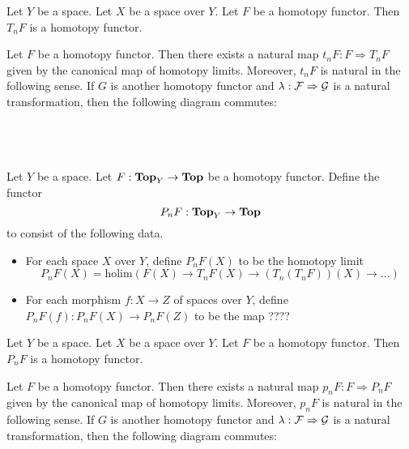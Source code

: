\documentclass[a4paper]{article}
\begin{document}
\begin{lmm}{}{} Let $Y$ be a space. Let $X$ be a space over $Y$. Let $F$ be a homotopy functor. Then $T_nF$ is a homotopy functor.   
\end{lmm}

\begin{prp}{}{} Let $F$ be a homotopy functor. Then there exists a natural map $t_nF:F\Rightarrow T_nF$ given by the canonical map of homotopy limits. Moreover, $t_nF$ is natural in the following sense. If $G$ is another homotopy functor and $\lambda:\mathcal{F}\Rightarrow\mathcal{G}$ is a natural transformation, then the following diagram commutes: \\~\\
\\~\\
\end{prp}

\begin{defn}{}{} Let $Y$ be a space. Let $F:\bold{Top}_Y\to\bold{Top}$ be a homotopy functor. Define the functor $$P_nF:\bold{Top}_Y\to\bold{Top}$$ to consist of the following data. 
\begin{itemize}
\item For each space $X$ over $Y$, define $P_nF(X)$ to be the homotopy limit $$P_nF(X)=\text{holim}(F(X)\to T_nF(X)\to(T_n(T_nF))(X)\to\dots)$$
\item For each morphism $f:X\to Z$ of spaces over $Y$, define $P_nF(f):P_nF(X)\to P_nF(Z)$ to be the map ????
\end{itemize}
\end{defn}

\begin{lmm}{}{} Let $Y$ be a space. Let $X$ be a space over $Y$. Let $F$ be a homotopy functor. Then $P_nF$ is a homotopy functor.   
\end{lmm}

\begin{prp}{}{} Let $F$ be a homotopy functor. Then there exists a natural map $p_nF:F\Rightarrow P_nF$ given by the canonical map of homotopy limits. Moreover, $p_nF$ is natural in the following sense. If $G$ is another homotopy functor and $\lambda:\mathcal{F}\Rightarrow\mathcal{G}$ is a natural transformation, then the following diagram commutes: \\~\\
\\~\\
\end{prp}
\end{document}
